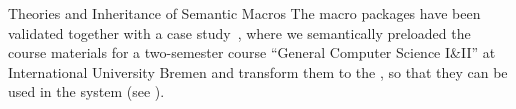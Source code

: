 \begin{omgroup}[id=stex,creators=miko]
\begin{omgroup}{Theories and Inheritance of Semantic Macros}
The {\stex} macro packages have been validated together with a case
study~\cite{Kohlhase:smtl05}, where we semantically preloaded the course materials for a
two-semester course ``General Computer Science I\&II'' at International University Bremen
and transform them to the {\omdoc}, so that they can be used in the {\activemath} system
(see {}).
\end{omgroup}
\end{omgroup}

